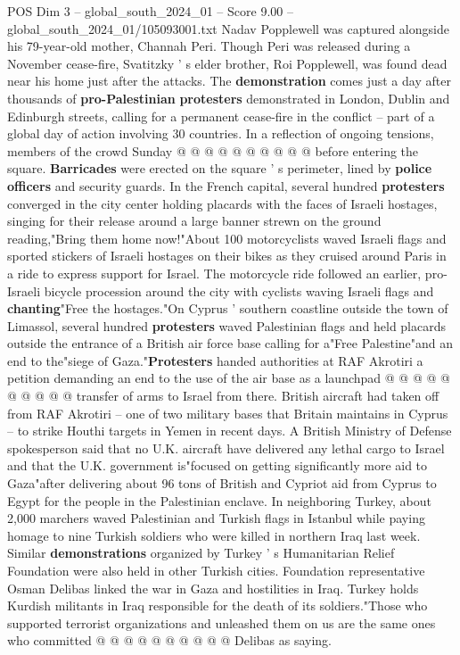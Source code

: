 \begin{textsample}{POS Dim 3 – global\_south\_2024\_01 – Score 9.00 – global\_south\_2024\_01/105093001.txt}
Nadav Popplewell was captured alongside his 79-year-old mother, Channah Peri.
Though Peri was released during a November cease-fire, Svatitzky ' s elder brother, Roi Popplewell, was found dead near his home just after the attacks.
The \textbf{demonstration} comes just a day after thousands of \textbf{pro-Palestinian} \textbf{protesters} demonstrated in London, Dublin and Edinburgh streets, calling for a permanent cease-fire in the conflict -- part of a global day of action involving 30 countries.
In a reflection of ongoing tensions, members of the crowd Sunday @ @ @ @ @ @ @ @ @ @ before entering the square. \textbf{Barricades} were erected on the square ' s perimeter, lined by \textbf{police} \textbf{officers} and security guards.
In the French capital, several hundred \textbf{protesters} converged in the city center holding placards with the faces of Israeli hostages, singing for their release around a large banner strewn on the ground reading,"Bring them home now!"About 100 motorcyclists waved Israeli flags and sported stickers of Israeli hostages on their bikes as they cruised around Paris in a ride to express support for Israel.
The motorcycle ride followed an earlier, pro-Israeli bicycle procession around the city with cyclists waving Israeli flags and \textbf{chanting}"Free the hostages."On Cyprus ' southern coastline outside the town of Limassol, several hundred \textbf{protesters} waved Palestinian flags and held placards outside the entrance of a British air force base calling for a"Free Palestine"and an end to the"siege of Gaza."\textbf{Protesters} handed authorities at RAF Akrotiri a petition demanding an end to the use of the air base as a launchpad @ @ @ @ @ @ @ @ @ @ transfer of arms to Israel from there.
British aircraft had taken off from RAF Akrotiri -- one of two military bases that Britain maintains in Cyprus -- to strike Houthi targets in Yemen in recent days.
A British Ministry of Defense spokesperson said that no U.K. aircraft have delivered any lethal cargo to Israel and that the U.K. government is"focused on getting significantly more aid to Gaza"after delivering about 96 tons of British and Cypriot aid from Cyprus to Egypt for the people in the Palestinian enclave.
In neighboring Turkey, about 2,000 marchers waved Palestinian and Turkish flags in Istanbul while paying homage to nine Turkish soldiers who were killed in northern Iraq last week.
Similar \textbf{demonstrations} organized by Turkey ' s Humanitarian Relief Foundation were also held in other Turkish cities.
Foundation representative Osman Delibas linked the war in Gaza and hostilities in Iraq.
Turkey holds Kurdish militants in Iraq responsible for the death of its soldiers."Those who supported terrorist organizations and unleashed them on us are the same ones who committed @ @ @ @ @ @ @ @ @ @ Delibas as saying.

\end{textsample}
